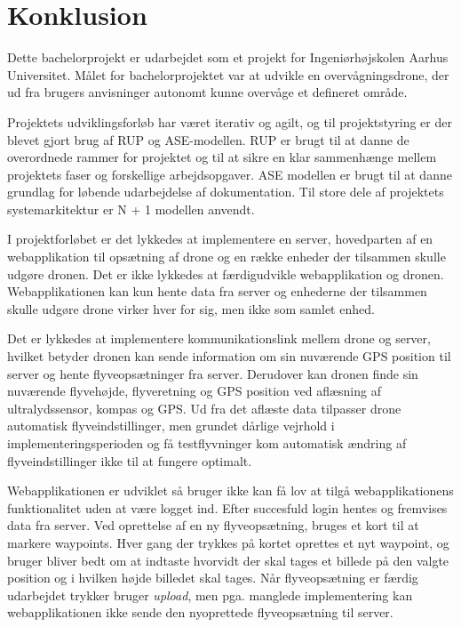 \section{Konklusion}

Dette bachelorprojekt er udarbejdet som et projekt for Ingeniørhøjskolen Aarhus Universitet. Målet for bachelorprojektet var at udvikle en overvågningsdrone, der ud fra brugers anvisninger autonomt kunne overvåge et defineret område. 

Projektets udviklingsforløb har været iterativ og agilt, og til projektstyring er der blevet gjort brug af RUP og ASE-modellen. RUP er brugt til at danne de overordnede rammer for projektet og til at sikre en klar sammenhænge mellem projektets faser og forskellige arbejdsopgaver. ASE modellen er brugt til at danne grundlag for løbende udarbejdelse af dokumentation. Til store dele af projektets systemarkitektur er N + 1 modellen anvendt.

I projektforløbet er det lykkedes at implementere en server, hovedparten af en webapplikation til opsætning af drone og en række enheder der tilsammen skulle udgøre dronen. Det er ikke lykkedes at færdigudvikle webapplikation og dronen. Webapplikationen kan kun hente data fra server og enhederne der tilsammen skulle udgøre drone virker hver for sig, men ikke som samlet enhed.

Det er lykkedes at implementere kommunikationslink mellem drone og server, hvilket betyder dronen kan sende information om sin nuværende GPS position til server og hente flyveopsætninger fra server. Derudover kan dronen finde sin nuværende flyvehøjde, flyveretning og GPS position ved aflæsning af ultralydssensor, kompas og GPS. Ud fra det aflæste data tilpasser drone automatisk flyveindstillinger, men grundet dårlige vejrhold i implementeringsperioden og få testflyvninger kom automatisk ændring af flyveindstillinger ikke til at fungere optimalt.

Webapplikationen er udviklet så bruger ikke kan få lov at tilgå webapplikationens funktionalitet uden at være logget ind. Efter succesfuld login hentes og fremvises data fra server. Ved oprettelse af en ny flyveopsætning, bruges et kort til at markere waypoints. Hver gang der trykkes på kortet oprettes et nyt waypoint, og bruger bliver bedt om at indtaste hvorvidt der skal tages et billede på den valgte position og i hvilken højde billedet skal tages.
Når flyveopsætning er færdig udarbejdet trykker bruger \textit{upload}, men pga. manglede implementering kan webapplikationen ikke sende den nyoprettede flyveopsætning til server. 

